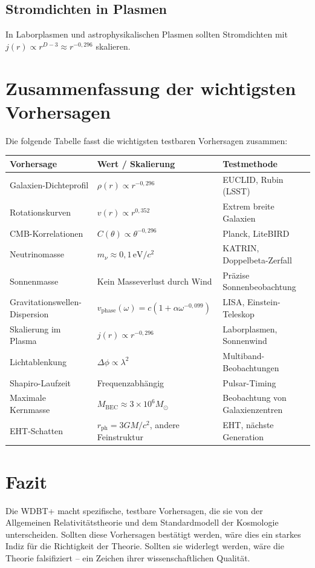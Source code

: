 \subsection{Stromdichten in Plasmen}
\label{sub:vorh_stromdichten}

In Laborplasmen und astrophysikalischen Plasmen sollten Stromdichten mit \( j(r) \propto r^{D-3} \approx r^{-0,296} \) skalieren.

\section{Zusammenfassung der wichtigsten Vorhersagen}
\label{sec:vorh_tabelle_zusammenfassung}

Die folgende Tabelle fasst die wichtigsten testbaren Vorhersagen zusammen:

\begin{tabular}{|l|l|l|}
\hline
\textbf{Vorhersage} & \textbf{Wert / Skalierung} & \textbf{Testmethode} \\
\hline
Galaxien-Dichteprofil & \(\rho(r) \propto r^{-0,296}\) & EUCLID, Rubin (LSST) \\
Rotationskurven & \(v(r) \propto r^{0,352}\) & Extrem breite Galaxien \\
CMB-Korrelationen & \(C(\theta) \propto \theta^{-0,296}\) & Planck, LiteBIRD \\
Neutrinomasse & \(m_\nu \approx 0,1 \, \text{eV}/c^2\) & KATRIN, Doppelbeta-Zerfall \\
Sonnenmasse & Kein Masseverlust durch Wind & Präzise Sonnenbeobachtung \\
Gravitationswellen-Dispersion & \(v_{\text{phase}}(\omega) = c(1 + \alpha \omega^{-0,099})\) & LISA, Einstein-Teleskop \\
Skalierung im Plasma & \(j(r) \propto r^{-0,296}\) & Laborplasmen, Sonnenwind \\
Lichtablenkung & \(\Delta\phi \propto \lambda^2\) & Multiband-Beobachtungen \\
Shapiro-Laufzeit & Frequenzabhängig & Pulsar-Timing \\
Maximale Kernmasse & \(M_{\text{BEC}} \approx 3 \times 10^6 M_\odot\) & Beobachtung von Galaxienzentren \\
EHT-Schatten & \(r_{\text{ph}} = 3GM/c^2\), andere Feinstruktur & EHT, nächste Generation \\
\hline
\end{tabular}

\section{Fazit}
\label{sec:vorh_fazit}

Die WDBT+ macht spezifische, testbare Vorhersagen, die sie von der Allgemeinen Relativitätstheorie und dem Standardmodell der Kosmologie unterscheiden. Sollten diese Vorhersagen bestätigt werden, wäre dies ein starkes Indiz für die Richtigkeit der Theorie. Sollten sie widerlegt werden, wäre die Theorie falsifiziert – ein Zeichen ihrer wissenschaftlichen Qualität.